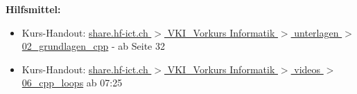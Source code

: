 \documentclass[a4paper,10pt]{article}
\begin{document}
\textbf{Hilfsmittel:} 

\begin{itemize}
\item Kurs-Handout: \href{https://share.hf-ict.ch/index.php/apps/files/?dir=/HF-ICT/VKI_Vorkurs%20Informatik/unterlagen&fileid=114518}{share.hf-ict.ch $>$ VKI\_Vorkurs Informatik $>$ unterlagen $>$ 02\_grundlagen\_cpp} - ab Seite 32
\item Kurs-Handout: \href{https://share.hf-ict.ch/index.php/apps/files/?dir=/HF-ICT/VKI_Vorkurs%20Informatik/videos&fileid=114517}{share.hf-ict.ch $>$ VKI\_Vorkurs Informatik $>$ videos $>$ 06\_cpp\_loops} ab 07:25
\end{itemize}
\end{document}
